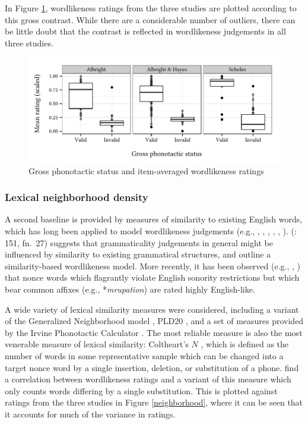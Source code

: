 In Figure \ref{boxplot}, wordlikeness ratings from the three studies are plotted according to this gross contrast. While there are a considerable number of outliers, there can be little doubt that the contrast is reflected in wordlikeness judgements in all three studies.

\begin{figure}[t]
\centering
\includegraphics{boxplot.pdf}
\caption{Gross phonotactic status and item-averaged wordlikeness ratings}
\label{boxplot}
\end{figure}

\subsubsection{Lexical neighborhood density}

A second baseline is provided by measures of similarity to existing English words, which has long been applied to model wordlikeness judgements (e.g., \citealt{Bailey2001}, \citealt{Greenberg1964}, \citealt{Kirby2007}, \citealt{Ohala1986b}, \citealt{Shademan2006,Shademan2007}, \citealt{Vitevitch1998,Vitevitch1999a}). \citeauthor{LSLT} (\citeyear{LSLT}: 151, fn.~27) suggests that grammaticality judgements in general might be influenced by similarity to existing grammatical structures, and \citet[417f.]{SPE} outline a similarity-based wordlikeness model. More recently, it has been observed (e.g., \citealt[51]{Coleman1997}, \citealt{Hay2004a}) that nonce words which flagrantly violate English sonority restrictions but which bear common affixes (e.g., *\emph{mrupation}) are rated highly English-like.

A wide variety of lexical similarity measures were considered, including a variant of the Generalized Neighborhood model \citep{Bailey2001}, PLD20 \citep{Suarez2011}, and a set of measures provided by the Irvine Phonotactic Calculator \citep{Vaden2009}. The most reliable measure is also the most venerable measure of lexical similarity: Coltheart's $N$ \citep{Coltheart1977}, which is defined as the number of words in some representative sample which can be changed into a target nonce word by a single insertion, deletion, or substitution of a phone. \citet{Greenberg1964} find a correlation between wordlikeness ratings and a variant of this measure which only counts words differing by a single substitution. This is plotted against ratings from the three studies in Figure \ref{neighborhood}, where it can be seen that it accounts for much of the variance in ratings.

